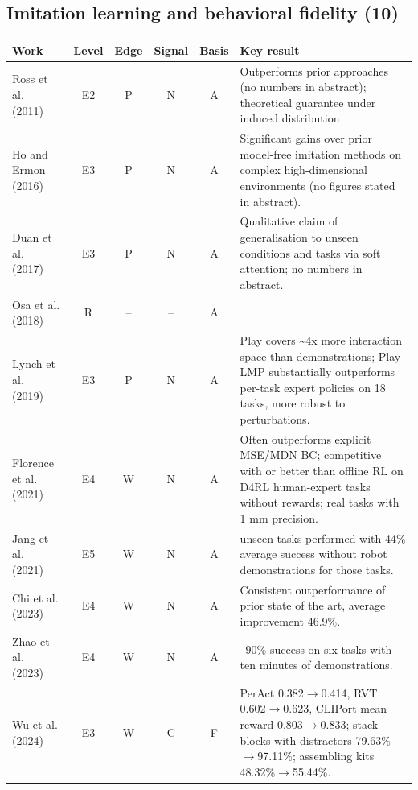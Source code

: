 \documentclass[10pt,a4paper]{article}
\begin{document}
\subsection*{Imitation learning and behavioral fidelity (10)}
\begin{longtable}{@{}>{\raggedright\arraybackslash}p{4.0cm}cccc>{\raggedright\arraybackslash}p{7.6cm}@{}}
\toprule \textbf{Work} & \textbf{Level} & \textbf{Edge} & \textbf{Signal} & \textbf{Basis} & \textbf{Key result} \\ \midrule \endhead
Ross et al. (2011)~\cite{Ross2011} & E2 & P & N & A & Outperforms prior approaches (no numbers in abstract); theoretical guarantee under induced distribution \\
Ho and Ermon (2016)~\cite{Ho2016} & E3 & P & N & A & Significant gains over prior model-free imitation methods on complex high-dimensional environments (no figures stated in abstract). \\
Duan et al. (2017)~\cite{Duan2017} & E3 & P & N & A & Qualitative claim of generalisation to unseen conditions and tasks via soft attention; no numbers in abstract. \\
Osa et al. (2018)~\cite{Osa2018} & R & -- & -- & A &  \\
Lynch et al. (2019)~\cite{Lynch2019} & E3 & P & N & A & Play covers \textasciitilde{}4x more interaction space than demonstrations; Play-LMP substantially outperforms per-task expert policies on 18 tasks, more robust to perturbations. \\
Florence et al. (2021)~\cite{Florence2021} & E4 & W & N & A & Often outperforms explicit MSE/MDN BC; competitive with or better than offline RL on D4RL human-expert tasks without rewards; real tasks with 1 mm precision. \\
Jang et al. (2021)~\cite{Jang2021} & E5 & W & N & A & 24 unseen tasks performed with 44\% average success without robot demonstrations for those tasks. \\
Chi et al. (2023)~\cite{Chi2023} & E4 & W & N & A & Consistent outperformance of prior state of the art, average improvement 46.9\%. \\
Zhao et al. (2023)~\cite{Zhao2023} & E4 & W & N & A & 80--90\% success on six tasks with ten minutes of demonstrations. \\
Wu et al. (2024)~\cite{Wu2024} & E3 & W & C & F & PerAct 0.382$\rightarrow$0.414, RVT 0.602$\rightarrow$0.623, CLIPort mean reward 0.803$\rightarrow$0.833; stack-blocks with distractors 79.63\%$\rightarrow$97.11\%; assembling kits 48.32\%$\rightarrow$55.44\%. \\
\bottomrule\end{longtable}
\end{document}
